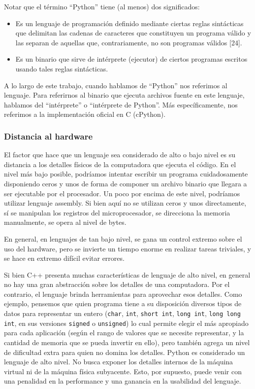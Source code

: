 \documentclass[]{article}
\begin{document}
Notar que el término ``Python'' tiene (al menos) dos significados:

\begin{itemize}
    \item Es un lenguaje de programación definido mediante ciertas reglas
sintácticas que delimitan las cadenas de caracteres que constituyen un programa
válido y las separan de aquellas que, contrariamente, no son programas válidos
[24].

    \item Es un binario que sirve de intérprete (ejecutor) de ciertos programas
escritos usando tales reglas sintácticas.
\end{itemize}

A lo largo de este trabajo, cuando hablamos de ``Python'' nos referimos al
lenguaje. Para referirnos al binario que ejecuta archivos fuente en este
lenguaje, hablamos del ``intérprete'' o ``intérprete de Python''. Más
específicamente, nos referimos a la implementación oficial en C (cPython). 

\subsubsection{Distancia al hardware}

El factor que hace que un lenguaje sea considerado de alto o bajo nivel es su
distancia a los detalles físicos de la computadora que ejecuta el código.
En el nivel más bajo posible, podríamos intentar escribir un programa
cuidadosamente disponiendo ceros y unos de forma de componer un archivo binario
que llegara a ser ejecutable por el procesador. Un poco por encima de este
nivel, podríamos utilizar lenguaje assembly. Si bien aquí no se utilizan ceros
y unos directamente, sí se manipulan los registros del microprocesador, se
direcciona la memoria manualmente, se opera al nivel de bytes.

En general, en lenguajes de tan bajo nivel, se gana un control extremo sobre el
uso del hardware, pero se invierte un tiempo enorme en realizar tareas
triviales, y se hace en extremo difícil evitar errores.

Si bien C++ presenta muchas características de lenguaje de alto nivel, en
general no hay una gran abstracción sobre los detalles de una computadora. Por
el contrario, el lenguaje brinda herramientas para aprovechar esos detalles.
Como ejemplo, pensemos que quien programa tiene a su disposición diversos tipos
de datos para representar un entero (\verb!char!, \verb!int!, \verb!short int!,
\verb!long int!, \verb!long long int!, en sus versiones \verb!signed! o
\verb!unsigned!) lo cual permite elegir el más apropiado para cada aplicación
(según el rango de valores que se necesite representar, y la cantidad de
memoria que se pueda invertir en ello), pero también agrega un nivel de
dificultad extra para quien no domina los detalles. Python es considerado un
lenguaje de alto nivel. No busca exponer los detalles internos de la máquina
virtual ni de la máquina física subyacente. Esto, por supuesto, puede venir con
una penalidad en la performance y una ganancia en la usabilidad del lenguaje.
\end{document}
